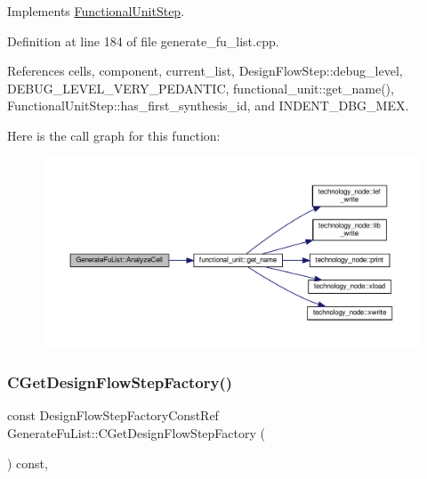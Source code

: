 Implements \hyperlink{classFunctionalUnitStep_afe8188cf489c2c980bc537f5ed37a5cc}{Functional\+Unit\+Step}.



Definition at line 184 of file generate\+\_\+fu\+\_\+list.\+cpp.



References cells, component, current\+\_\+list, Design\+Flow\+Step\+::debug\+\_\+level, D\+E\+B\+U\+G\+\_\+\+L\+E\+V\+E\+L\+\_\+\+V\+E\+R\+Y\+\_\+\+P\+E\+D\+A\+N\+T\+IC, functional\+\_\+unit\+::get\+\_\+name(), Functional\+Unit\+Step\+::has\+\_\+first\+\_\+synthesis\+\_\+id, and I\+N\+D\+E\+N\+T\+\_\+\+D\+B\+G\+\_\+\+M\+EX.

Here is the call graph for this function\+:
\nopagebreak
\begin{figure}[H]
\begin{center}
\leavevmode
\includegraphics[width=350pt]{db/dea/classGenerateFuList_a133ca515874d6d494d54dae031046a25_cgraph}
\end{center}
\end{figure}
\mbox{\label{classGenerateFuList_a51c1a9b6fe9a61328d6dc99d8e0bd47c}} 
\subsubsection{\texorpdfstring{C\+Get\+Design\+Flow\+Step\+Factory()}{CGetDesignFlowStepFactory()}}
{\footnotesize\ttfamily const Design\+Flow\+Step\+Factory\+Const\+Ref Generate\+Fu\+List\+::\+C\+Get\+Design\+Flow\+Step\+Factory (\begin{DoxyParamCaption}{ }\end{DoxyParamCaption}) const\hspace{0.3cm}{\ttfamily [override]}, {\ttfamily [virtual]}}



